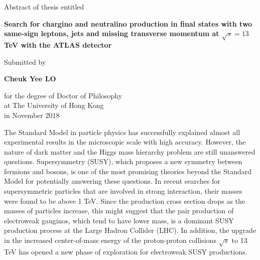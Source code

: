 {}

\begin{center}

Abstract of thesis entitled\\

\bigskip

    \huge\textbf{Search for chargino and neutralino production in final states with two same-sign leptons, jets and missing transverse momentum at $\sqrt{s} = 13$ TeV with the ATLAS detector} \\

    \bigskip

    {\normalsize Submitted by}\\

\bigskip

    \Large{\textbf{Cheuk Yee LO}}\\

\bigskip

{\normalsize
for the degree of Doctor of Philosophy\\
at The University of Hong Kong\\
in November 2018\\}

\end{center}

\bigskip

The Standard Model in particle physics has successfully explained almost all experimental results in the microscopic scale with high accuracy.
However, the nature of dark matter and the Higgs mass hierarchy problem are still unanswered questions.
Supersymmetry (SUSY), which proposes a new symmetry between fermions and bosons, is one of the most promising theories beyond the Standard Model for potentially answering these questions.
In recent searches for supersymmetric particles that are involved in strong interaction, their masses were found to be above 1 TeV.
Since the production cross section drops as the masses of particles increase,
this might suggest that the pair production of electroweak gauginos, which tend to have lower mass, is a dominant SUSY production process at the Large Hadron Collider (LHC).
In addition, the upgrade in the increased center-of-mass energy of the proton-proton collisions $\sqrt{s}$ to 13 TeV has opened a new phase of exploration for electroweak SUSY productions.


